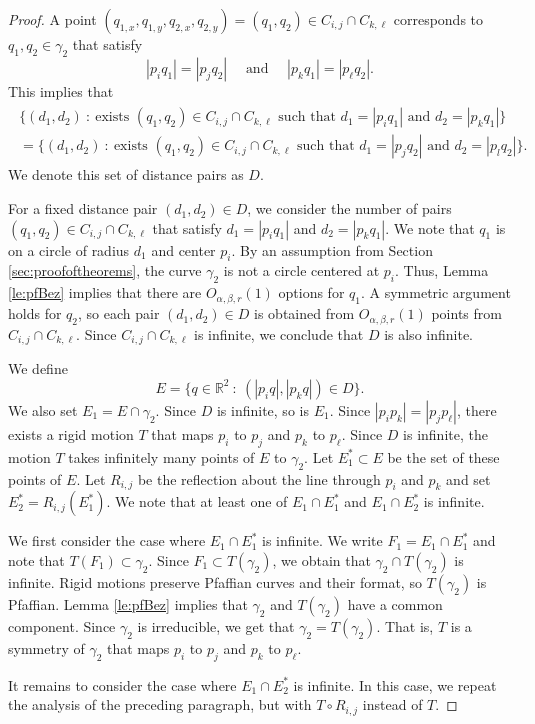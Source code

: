 \documentclass[11pt]{article}
\theoremstyle{definition}
\newcommand{\RR}{\mathbb R}
\begin{document}
\begin{proof}
 A point $(q_{1,x},q_{1,y},q_{2,x},q_{2,y}) = (q_1,q_2)\in C_{i,j}\cap C_{k,\ell}$ 
 corresponds to $q_1, q_2\in \gamma_2$ 
 that satisfy
\[ |p_i q_1| = |p_j q_2| \quad \text{ and }\quad |p_k q_1| = |p_\ell q_2|. \] 
%
This implies that 
 \begin{align*}
  \begin{split}
   \{ (d_1,d_2)\ :\ \text{exists } (q_1, q_2)\in C_{i,j}\cap C_{k,\ell} \text{ such that } d_1 = |p_i q_1|\text{ and } d_2 = |p_k q_1|\}\\[2mm]
   = \{ (d_1,d_2)\ :\ \text{exists } (q_1, q_2)\in C_{i,j}\cap C_{k,\ell} \text{ such that } d_1 = |p_j q_2|\text{ and } d_2 = |p_l q_2|\}.
  \end{split}
 \end{align*}
We denote this set of distance pairs as $D$.

For a fixed distance pair $(d_1,d_2)\in D$, we consider the number of pairs $(q_1,q_2)\in C_{i,j}\cap C_{k,\ell}$ that satisfy $d_1 = |p_i q_1|$ and $d_2 = |p_k q_1|$.
We note that $q_1$ is on a circle of radius $d_1$  and center $p_i$.
By an assumption from Section \ref{sec:proofoftheorems}, the curve $\gamma_2$ is not a circle centered at $p_i$.
Thus, Lemma \ref{le:pfBez} implies that there are $O_{\alpha,\beta,r}(1)$ options for $q_1$.
A symmetric argument holds for $q_2$, so each pair $(d_1,d_2)\in D$ is obtained from $O_{\alpha,\beta,r}(1)$ points from $C_{i,j}\cap C_{k,\ell}$.
Since $C_{i,j} \cap C_{k,\ell}$ is infinite,
we conclude that $D$ is also infinite.
  
We define 
%
\[ E = \{ q\in \RR^2\ :\ \left (|p_i q|, |p_k q|\right)\in D\}. \]
%
We also set $E_1 = E\cap \gamma_2$. 
Since $D$ is infinite, so is $E_1$.
Since $|p_ip_k|=|p_jp_\ell|$, there exists a rigid motion $T$ that maps $p_i$ to $p_j$ and $p_k$ to $p_\ell$.
Since $D$ is infinite, the motion $T$ takes infinitely many points of $E$ to $\gamma_2$.
Let $E_1^*\subset E$ be the set of these points of $E$. Let $R_{i,j}$ be the reflection about the line through $p_i$ and $p_k$ and set $E_2^*=R_{i,j}(E_1^*)$.
We note that at least one of $E_1\cap E_1^*$ and $E_1\cap E_2^*$ is infinite.

We first consider the case where $E_1\cap E_1^*$ is infinite. 
We write $F_1 = E_1\cap E_1^*$ and note that $T(F_1)\subset \gamma_2$.
Since $F_1 \subset T(\gamma_2)$, we obtain that $\gamma_2\cap T(\gamma_2)$ is infinite. 
Rigid motions preserve Pfaffian curves and their format, so $T(\gamma_2)$ is Pfaffian. 
Lemma \ref{le:pfBez} implies that $\gamma_2$ and $T(\gamma_2)$ have a common component. 
Since $\gamma_2$ is irreducible, we get that $\gamma_2=T(\gamma_2)$.
That is, $T$ is a symmetry of $\gamma_2$ that maps $p_i$ to $p_j$ and $p_k$ to $p_\ell$.

It remains to consider the case where $E_1\cap E_2^*$ is infinite.
In this case, we repeat the analysis of the preceding paragraph, but with $T\circ R_{i,j}$ instead of $T$.
\end{proof}
\end{document}
